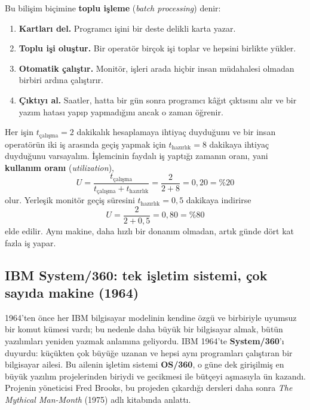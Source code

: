\documentclass[11pt,a4paper]{article}
\newcommand{\term}[1]{\textbf{\color{mintdeep}#1}}
\begin{document}
Bu bilişim biçimine \term{toplu işleme} (\emph{batch processing}) denir:

\begin{enumerate}[leftmargin=1.4em]
  \item \textbf{Kartları del.} Programcı işini bir deste delikli karta yazar.
  \item \textbf{Toplu işi oluştur.} Bir operatör birçok işi toplar ve hepsini birlikte yükler.
  \item \textbf{Otomatik çalıştır.} Monitör, işleri arada hiçbir insan müdahalesi olmadan birbiri ardına çalıştırır.
  \item \textbf{Çıktıyı al.} Saatler, hatta bir gün sonra programcı kâğıt çıktısını alır ve bir yazım hatası yapıp yapmadığını ancak o zaman öğrenir.
\end{enumerate}

\begin{example}
Her işin $t_{\text{çalışma}} = 2$ dakikalık hesaplamaya ihtiyaç duyduğunu ve bir insan operatörün iki iş arasında geçiş yapmak için $t_{\text{hazırlık}} = 8$ dakikaya ihtiyaç duyduğunu varsayalım. İşlemcinin faydalı iş yaptığı zamanın oranı, yani \term{kullanım oranı} (\emph{utilization}),
\[
U = \frac{t_{\text{çalışma}}}{t_{\text{çalışma}} + t_{\text{hazırlık}}} = \frac{2}{2+8} = 0{,}20 = \%20
\]
olur. Yerleşik monitör geçiş süresini $t_{\text{hazırlık}} = 0{,}5$ dakikaya indirirse
\[
U = \frac{2}{2+0{,}5} = 0{,}80 = \%80
\]
elde edilir. Aynı makine, daha hızlı bir donanım olmadan, artık günde dört kat fazla iş yapar.
\end{example}

\subsection{IBM System/360: tek işletim sistemi, çok sayıda makine (1964)}

1964'ten önce her IBM bilgisayar modelinin kendine özgü ve birbiriyle uyumsuz bir komut kümesi vardı; bu nedenle daha büyük bir bilgisayar almak, bütün yazılımları yeniden yazmak anlamına geliyordu. IBM 1964'te \term{System/360}'ı duyurdu: küçükten çok büyüğe uzanan ve hepsi aynı programları çalıştıran bir bilgisayar ailesi. Bu ailenin işletim sistemi \term{OS/360}, o güne dek girişilmiş en büyük yazılım projelerinden biriydi ve gecikmesi ile bütçeyi aşmasıyla ün kazandı. Projenin yöneticisi Fred Brooks, bu projeden çıkardığı dersleri daha sonra \emph{The Mythical Man-Month} (1975) adlı kitabında anlattı.
\end{document}
